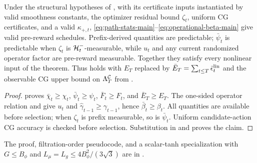 \begin{corollary}\label{cor:operational}
Under the structural hypotheses of , with its certificate
inputs instantiated by valid smoothness constants, the
optimizer residual bound $\zeta_t$, uniform CG certificates, and a valid
$\kappa_{+,t}$, \eqref{eq:path-stats-main}--\eqref{eq:operational-beta-main}
give valid pre-reward schedules.  Prefix-derived quantities are predictable;
$\bar\psi_t$ is predictable when $\zeta_t$ is $\mathcal{H}_t^-$-measurable, while
$u_t$ and any current randomized operator factor are pre-reward measurable.
Together they satisfy every nonlinear input of the theorem.  Thus
 holds with $E_T$ replaced by
$\bar E_T=\sum_{t\le T}\bar\epsilon_t^{\rm lin}$ and the observable CG upper
bound on $\Lambda^{\mathcal{C}}_T$ from .
\end{corollary}
\begin{proof}
 proves
$\bar\chi_t\ge\chi_t$, $\bar\psi_t\ge\psi_t$,
$\bar F_t\ge F_t$, and $\bar E_T\ge E_T$.  The one-sided operator relation
and  give $u_t$ and
$\hat\gamma_{t-1}\ge\gamma_{t-1}$, hence
$\bar\beta_t\ge\beta_t$.  All quantities are available before selection; when
$\zeta_t$ is prefix measurable, so is $\bar\psi_t$.  Uniform candidate-action
CG accuracy is checked before selection.  Substitution in  and
 proves the claim.
\end{proof}
The proof, filtration-order pseudocode, and a scalar-tanh specialization with
$G\le B_\phi$ and $L_\mu=L_g\le4B_\phi^2/(3\sqrt3)$ are in
.

